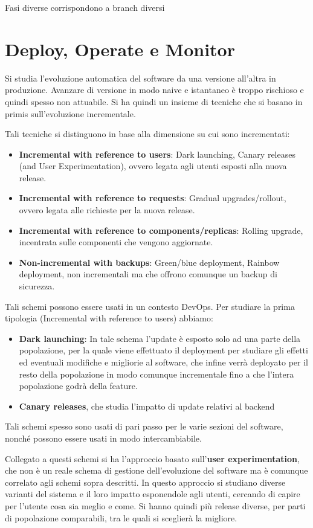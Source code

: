 Fasi diverse corrispondono a branch diversi
\section{Deploy, Operate e Monitor}
Si studia l'evoluzione automatica del software da una versione all'altra in produzione. Avanzare di versione in modo naive e istantaneo è troppo rischioso e quindi spesso non attuabile. Si ha quindi un insieme di tecniche che si basano in primis sull'evoluzione incrementale.

Tali tecniche si distinguono in base alla dimensione su cui sono incrementati:
\begin{itemize}
    \item \textbf{Incremental with reference to users}: Dark launching, Canary releases (and User Experimentation), ovvero legata agli utenti esposti alla nuova release.
    \item \textbf{Incremental with reference to requests}: Gradual upgrades/rollout, ovvero legata alle richieste per la nuova release.
    \item \textbf{Incremental with reference to components/replicas}: Rolling upgrade, incentrata sulle componenti che vengono aggiornate.
    \item \textbf{Non-incremental with backups}: Green/blue deployment, Rainbow deployment, non incrementali ma che offrono comunque un backup di sicurezza.
\end{itemize}

Tali schemi possono essere usati in un contesto DevOps. Per studiare la prima tipologia (Incremental with reference to users) abbiamo:
\begin{itemize}
    \item \textbf{Dark launching}: In tale schema l’update è esposto solo ad una parte della popolazione, per la quale viene effettuato il deployment per studiare gli effetti ed eventuali modifiche e migliorie al software, che infine verrà deployato per il resto della popolazione in modo comunque incrementale fino a che l’intera popolazione godrà della feature.
    \item \textbf{Canary releases}, che studia l’impatto di update relativi al backend
\end{itemize}

Tali schemi spesso sono usati di pari passo per le varie sezioni del software, nonché possono essere usati in modo intercambiabile.

Collegato a questi schemi si ha l’approccio basato sull'\textbf{user experimentation}, che non è un reale schema di gestione dell’evoluzione del software ma è comunque correlato agli schemi sopra descritti. In questo approccio si studiano diverse varianti del sistema e il loro impatto esponendole agli utenti, cercando di capire per l’utente cosa sia meglio e come. Si hanno quindi più release diverse, per parti di popolazione comparabili, tra le quali si sceglierà la migliore.

